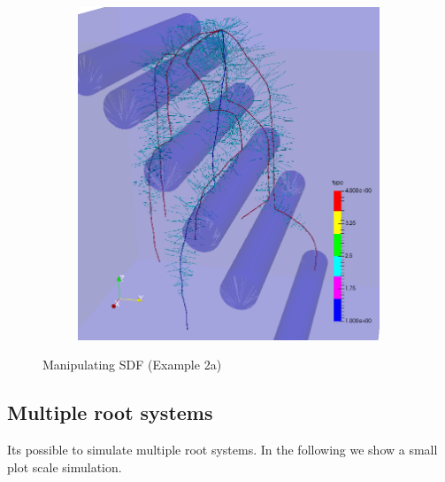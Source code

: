 \documentclass[a4paper]{article}
\begin{document}
\begin{figure}
\begin{subfigure}[c]{0.3\textwidth}
 \label{fig:split}
\end{subfigure}
\begin{subfigure}[c]{0.3\textwidth}
\includegraphics[width=0.99\textwidth]{example_2a3.png}
 \label{fig:rhizotubes}
\end{subfigure}
\caption{Manipulating SDF (Example 2a)}
\end{figure}

\subsection{Multiple root systems}

Its possible to simulate multiple root systems. In the following we show a small plot scale simulation.


\end{document}
